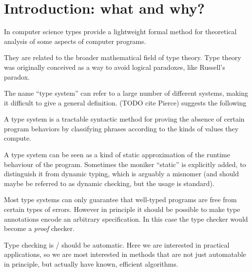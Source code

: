 \section{Introduction: what and why?}
In computer science types provide a lightweight formal method for theoretical analysis of some aspects of computer programs.

They are related to the broader mathematical field of type theory. Type theory was originally conceived as a way to avoid logical paradoxes, like Russell's paradox.

The name ``type system'' can refer to a large number of different systems, making it difficult to give a general definition. (TODO cite Pierce) suggests the following

\begin{displayquote}
A type system is a tractable syntactic method for proving the absence of certain program behaviors by classifying phrases according to the kinds of values they compute.
\end{displayquote}

A type system can be seen as a kind of static approximation of the runtime behaviour of the program. Sometimes the moniker ``static'' is explicitly added, to distinguish it from dynamic typing, which is arguably a misnomer (and should maybe be referred to as dynamic checking, but the usage is standard).

Most type systems can only guarantee that well-typed programs are free from certain types of errors. However in principle it should be possible to make type annotations encode an arbitrary specification. In this case the type checker would become a \textit{proof} checker.

Type checking is / should be automatic. Here we are interested in practical applications, so we are most interested in methods that are not just automatable in principle, but actually have known, efficient algorithms.

